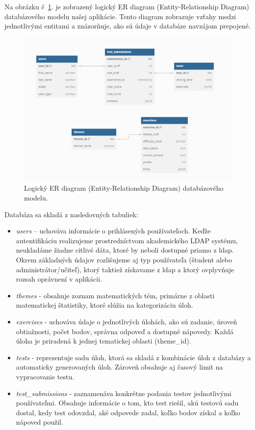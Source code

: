 Na obrázku č~\ref{dbtableobr}. je zobrazený logický ER diagram (Entity-Relationship Diagram) databázového modelu našej aplikácie.
 Tento diagram zobrazuje vzťahy medzi jednotlivými entitami a znázorňuje, ako sú údaje v databáze navzájom prepojené.
\begin{figure}[htbp]
  \centering
  \includegraphics[width=12cm]{img/dbtablefinal.png}
  \caption{Logický ER diagram (Entity-Relationship Diagram) databázového modelu.}
  \label{dbtableobr}
\end{figure} 


Databáza sa skladá z nasledovných tabuliek:
\begin{itemize}
  \item \textit{users} – uchováva informácie o prihlásených používateľoch. 
  Keďže autentifikáciu realizujeme prostredníctvom akademického LDAP systému, neukladáme žiadne citlivé dáta, ktoré by neboli dostupné priamo z \acrshort{ldap}. 
  Okrem základných údajov rozlišujeme aj typ používateľa (študent alebo administrátor/učiteľ), ktorý taktiež získavame z \acrshort{ldap} a ktorý ovplyvňuje rozsah oprávnení v aplikácii.
  \item \textit{themes} - obsahuje zoznam matematických tém, primárne z oblasti matematickej štatistiky, ktoré slúžia na kategorizáciu úloh.
  \item \textit{exercises} - uchováva údaje o jednotlivých úlohách, ako sú zadanie, úroveň obtiažnosti, počet bodov, správna odpoveď a dostupné nápovedy. 
  Každá úloha je priradená k jednej tematickej oblasti (theme\_id).
  \item \textit{tests} - reprezentuje sadu úloh, ktorá sa skladá z kombinácie úloh z databázy a automaticky generovaných úloh. Zároveň obsahuje aj časový limit na vypracovanie testu.
  \item \textit{test\_submissions} -  zaznamenáva konkrétne podania testov jednotlivými používateľmi.
   Obsahuje informácie o tom, kto test riešil, akú testovú sadu dostal, kedy test odovzdal, aké odpovede zadal, koľko bodov získal a koľko nápoved použil.
\end{itemize}

